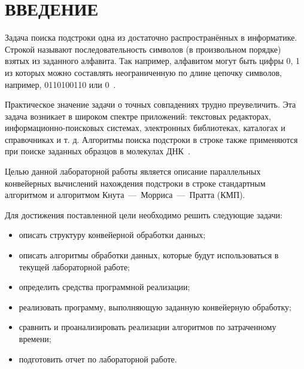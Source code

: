 \section*{ВВЕДЕНИЕ}

Задача поиска подстроки одна из достаточно распространённых в информатике. Строкой называют последовательность символов (в произвольном порядке) взятых из заданного алфавита. Так например, алфавитом могут быть цифры {0, 1} из которых можно составлять неограниченную по длине цепочку символов, например, 0110100110 или 0~\cite{max}. 

Практическое значение задачи о точных совпадениях трудно преувеличить. 
Эта задача возникает в широком спектре приложений: текстовых редакторах, информационно-поисковых системах, электронных библиотеках, каталогах и справочниках и т. д. 
Алгоритмы поиска подстроки в строке также применяются при поиске заданных образцов в молекулах ДНК~\cite{алексеенко2010информационная}.

Целью данной лабораторной работы является описание параллельных конвейерных вычислений нахождения подстроки в строке стандартным алгоритмом и алгоритмом Кнута~---~Морриса~---~Пратта (КМП).

Для достижения поставленной цели необходимо решить следующие задачи:
\begin{itemize}
	\item описать структуру конвейерной обработки данных;
	\item описать алгоритмы обработки данных, которые будут использоваться в текущей лабораторной работе;
	\item определить средства программной реализации;
	\item реализовать программу, выполняющую заданную конвейерную обработку;
	\item сравнить и проанализировать реализации алгоритмов по затраченному времени;
	\item подготовить отчет по лабораторной работе.
\end{itemize}